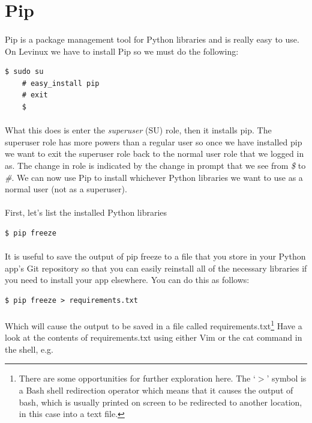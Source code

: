 \documentclass[12pt, a4paper, twoside]{book}
\begin{document}
\section{Pip}
\label{pip}
\paragraph{} Pip is a package management tool for Python libraries and is really easy to use. On Levinux we have to install Pip so we must do the following:

\begin{lstlisting}[style=DOS]
    $ sudo su
    # easy_install pip
    # exit
    $
\end{lstlisting}

\paragraph{} What this does is enter the \emph{superuser} (SU) role, then it installs pip. The superuser role has more powers than a regular user so once we have installed pip we want to exit the superuser role back to the normal user role that we logged in as. The change in role is indicated by the change in prompt that we see from \emph{\$} to \emph{\#}. We can now use Pip to install whichever Python libraries we want to use as a normal user (not as a superuser). 

\paragraph{} First, let's list the installed Python libraries

\begin{lstlisting}[style=DOS]
    $ pip freeze
\end{lstlisting}

\paragraph{} It is useful to save the output of pip freeze to a file that you store in your Python app's Git repository so that you can easily reinstall all of the necessary libraries if you need to install your app elsewhere. You can do this as follows:

\begin{lstlisting}[style=DOS]
    $ pip freeze > requirements.txt
\end{lstlisting}

\paragraph{} Which will cause the output to be saved in a file called requirements.txt\footnote{There are some opportunities for further exploration here. The `$>$' symbol is a Bash shell redirection operator which means that it causes the output of bash, which is usually printed on screen to be redirected to another location, in this case into a text file.} Have a look at the contents of requirements.txt using either Vim or the cat command in the shell, e.g.
\end{document}
